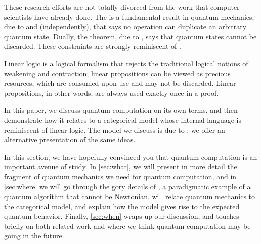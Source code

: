 These research efforts are not totally divorced from the work that computer
scientists have already done.  The  is a fundamental
result in quantum mechanics, due to \cite{wootters1982single} and
\cite{dieks1982communication} (independently), that says no operation can
duplicate an arbitrary quantum state.  Dually, the  theorem,
due to , says that quantum states cannot be discarded.  These
constraints are strongly reminiscent of .

Linear logic is a logical formalism that rejects the traditional logical
notions of weakening and contraction; linear propositions can be viewed as
precious resources, which are consumed upon use and may not be discarded.
Linear propositions, in other words, are always used exactly once in a proof.

In this paper, we discuss quantum computation on its own terms, and then
demonstrate how it relates to a categorical model whose internal language is
reminiscent of linear logic.  The model we discuss is due to \cite{abramsky2009categorical};
we offer an alternative presentation of the same ideas.

In this section, we have hopefully convinced you that quantum computation is an
important avenue of study.  In \cref{sec:what}, we will present in more detail
the fragment of quantum mechanics we need for quantum computation, and in
\cref{sec:where} we will go through the gory details of , a paradigmatic example of a quantum algorithm that cannot be
Newtonian.   will relate quantum mechanics to the categorical model,
and explain how the model gives rise to the expected quantum behavior.  Finally,
\cref{sec:when} wraps up our discussion, and touches briefly on both related
work and where we think quantum computation may be going in the future.
